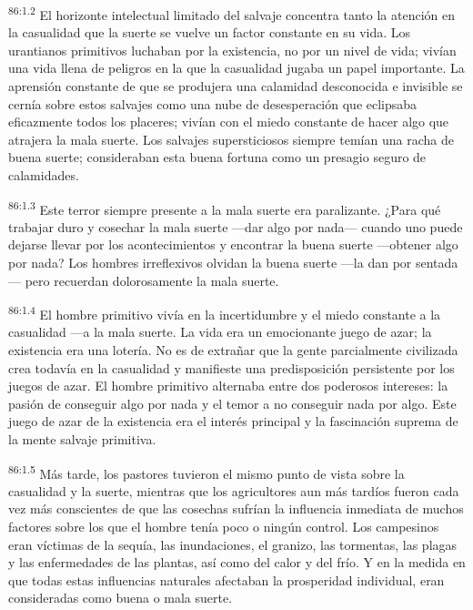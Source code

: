 \documentclass[twoside, 11pt]{book}
\begin{document}
\par
\textsuperscript{86:1.2} El horizonte intelectual limitado del salvaje concentra tanto la atención en la casualidad que la suerte se vuelve un factor constante en su vida. Los urantianos primitivos luchaban por la existencia, no por un nivel de vida; vivían una vida llena de peligros en la que la casualidad jugaba un papel importante. La aprensión constante de que se produjera una calamidad desconocida e invisible se cernía sobre estos salvajes como una nube de desesperación que eclipsaba eficazmente todos los placeres; vivían con el miedo constante de hacer algo que atrajera la mala suerte. Los salvajes supersticiosos siempre temían una racha de buena suerte; consideraban esta buena fortuna como un presagio seguro de calamidades.

\par
\textsuperscript{86:1.3} Este terror siempre presente a la mala suerte era paralizante. ¿Para qué trabajar duro y cosechar la mala suerte ---dar algo por nada--- cuando uno puede dejarse llevar por los acontecimientos y encontrar la buena suerte ---obtener algo por nada? Los hombres irreflexivos olvidan la buena suerte ---la dan por sentada--- pero recuerdan dolorosamente la mala suerte.

\par
\textsuperscript{86:1.4} El hombre primitivo vivía en la incertidumbre y el miedo constante a la casualidad ---a la mala suerte. La vida era un emocionante juego de azar; la existencia era una lotería. No es de extrañar que la gente parcialmente civilizada crea todavía en la casualidad y manifieste una predisposición persistente por los juegos de azar. El hombre primitivo alternaba entre dos poderosos intereses: la pasión de conseguir algo por nada y el temor a no conseguir nada por algo. Este juego de azar de la existencia era el interés principal y la fascinación suprema de la mente salvaje primitiva.

\par
\textsuperscript{86:1.5} Más tarde, los pastores tuvieron el mismo punto de vista sobre la casualidad y la suerte, mientras que los agricultores aun más tardíos fueron cada vez más conscientes de que las cosechas sufrían la influencia inmediata de muchos factores sobre los que el hombre tenía poco o ningún control. Los campesinos eran víctimas de la sequía, las inundaciones, el granizo, las tormentas, las plagas y las enfermedades de las plantas, así como del calor y del frío. Y en la medida en que todas estas influencias naturales afectaban la prosperidad individual, eran consideradas como buena o mala suerte.
\end{document}
